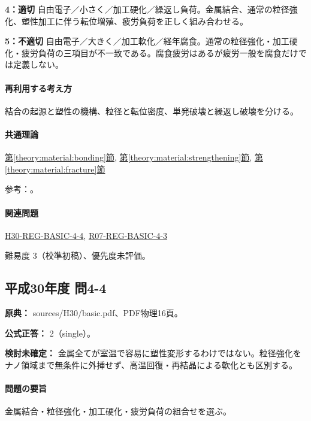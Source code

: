 \noindent\textbf{4：適切} 自由電子／小さく／加工硬化／繰返し負荷。金属結合、通常の粒径強化、塑性加工に伴う転位増殖、疲労負荷を正しく組み合わせる。\par

\noindent\textbf{5：不適切} 自由電子／大きく／加工軟化／経年腐食。通常の粒径強化・加工硬化・疲労負荷の三項目が不一致である。腐食疲労はあるが疲労一般を腐食だけでは定義しない。\par

\paragraph{再利用する考え方} 結合の起源と塑性の機構、粒径と転位密度、単発破壊と繰返し破壊を分ける。

\paragraph{共通理論} \hyperref[theory:material:bonding]{第\ref*{theory:material:bonding}節}, \hyperref[theory:material:strengthening]{第\ref*{theory:material:strengthening}節}, \hyperref[theory:material:fracture]{第\ref*{theory:material:fracture}節}

\par 参考：\cite{mit_material_dislocations2001,mit_material_fatigue2001,mit_material_atomistic2001}。

\paragraph{関連問題} \hyperref[q:h30-reg-basic-4-4]{H30-REG-BASIC-4-4}, \hyperref[q:r07-reg-basic-4-3]{R07-REG-BASIC-4-3}

\par 難易度 3（校準初稿）、優先度未評価。

\subsection{平成30年度 問4-4}
\label{q:h30-reg-basic-4-4}

\noindent\textbf{原典：} sources/H30/basic.pdf、PDF物理16頁。

\textbf{公式正答：} 2（single）。

\par\textbf{検討未確定：} 金属全てが室温で容易に塑性変形するわけではない。粒径強化をナノ領域まで無条件に外挿せず、高温回復・再結晶による軟化とも区別する。

\paragraph{問題の要旨} 金属結合・粒径強化・加工硬化・疲労負荷の組合せを選ぶ。

